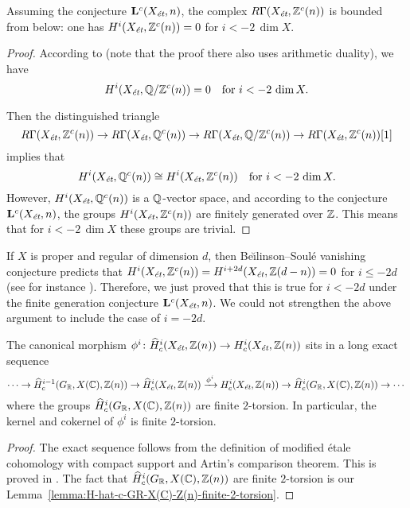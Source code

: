 \documentclass{article}
\numberwithin{equation}{section}
\begin{document}
\begin{lemma}
  \label{lemma:RGamma(Xet,Zc(n))-bounded-from-below}
  Assuming the conjecture $\mathbf{L}^c (X_\et, n)$, the complex
  $R\Gamma (X_\et, \ZZ^c (n))$ is bounded from below:
  one has $H^i (X_\et, \ZZ^c (n)) = 0$ for $i < -2\,\dim X$.

  \begin{proof}
    According to \cite[Lemma~5.12]{Morin-2014} (note that the proof there also
    uses arithmetic duality), we have
    $$H^i (X_\et, \QQ/\ZZ^c (n)) = 0 \quad\text{for }i < -2\,\dim X.$$

    Then the distinguished triangle
    \[ R\Gamma (X_\et, \ZZ^c (n)) \to
      R\Gamma (X_\et, \QQ^c (n)) \to
      R\Gamma (X_\et, \QQ/\ZZ^c (n)) \to
      R\Gamma (X_\et, \ZZ^c (n)) [1] \]
    implies that
    \[ H^i (X_\et, \QQ^c (n)) \cong
      H^i (X_\et, \ZZ^c (n)) \quad\text{for }i < -2\,\dim X. \]
    However, $H^i (X_\et, \QQ^c (n))$ is a $\QQ$-vector space, and
    according to the conjecture $\mathbf{L}^c (X_\et, n)$, the groups
    $H^i (X_\et, \ZZ^c (n))$ are finitely generated over $\ZZ$. This
    means that for $i < -2\,\dim X$ these groups are trivial.
  \end{proof}
\end{lemma}

\begin{remark}
  If $X$ is proper and regular of dimension $d$, then Be\u{\i}linson--Soulé
  vanishing conjecture predicts that
  $H^i (X_\et, \ZZ^c (n)) = H^{i+2d} (X_\et, \ZZ (d-n)) = 0$ for $i \le -2d$
  (see for instance \cite[\S 4.3.4]{Kahn-2005}). Therefore, we just proved that
  this is true for $i < -2d$ under the finite generation conjecture
  $\mathbf{L}^c (X_\et, n)$. We could not strengthen the above argument to
  include the case of $i = -2d$.
\end{remark}

\begin{lemma}
  \label{lemma:morphism-hat-Hc(Xet,Z(n))->Hc(Xet,Z(n))}
  The canonical morphism
  $\phi^i\colon \widehat{H}^i_c (X_\et, \ZZ (n)) \to H^i_c (X_\et, \ZZ (n))$
  sits in a long exact sequence
  \[ \cdots \to \widehat{H}^{i-1}_c (G_\RR, X (\CC), \ZZ (n)) \to
  \widehat{H}_c^i (X_\et, \ZZ(n)) \xrightarrow{\phi^i}
  H_c^i (X_\et, \ZZ(n)) \to
  \widehat{H}^i_c (G_\RR, X (\CC), \ZZ (n)) \to \cdots \]
  where the groups $\widehat{H}^i_c (G_\RR, X (\CC), \ZZ (n))$ are finite
  $2$-torsion.  In particular, the kernel and cokernel of
  $\phi^i$ is finite $2$-torsion.

  \begin{proof}
    The exact sequence follows from the definition of modified étale cohomology
    with compact support and Artin's comparison theorem. This is proved in
    \cite[Lemma~6.14]{Flach-Morin-2018}.
    The fact that $\widehat{H}^i_c (G_\RR, X (\CC), \ZZ (n))$ are finite
    $2$-torsion is our Lemma~\ref{lemma:H-hat-c-GR-X(C)-Z(n)-finite-2-torsion}.
  \end{proof}
\end{lemma}
\end{document}
